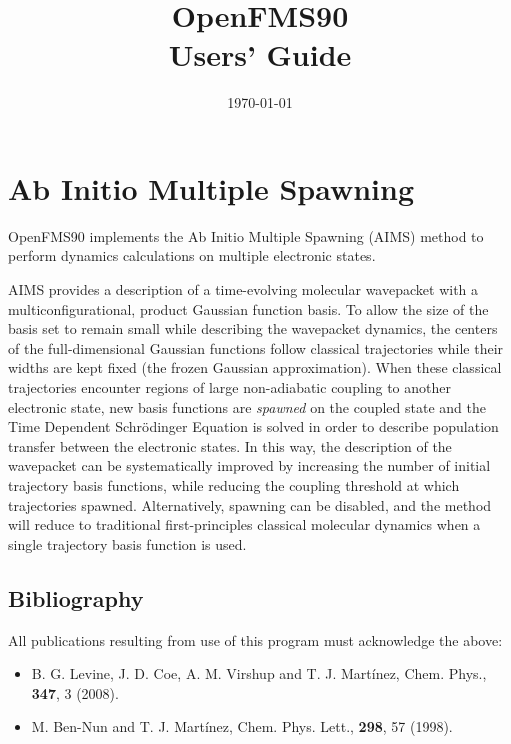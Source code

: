 \documentclass[11pt]{article}
\title{OpenFMS90 \\ Users' Guide}
\date{\today}
\begin{document}
\maketitle


\newpage
\tableofcontents
\newpage

\section{Ab Initio Multiple Spawning}


OpenFMS90 implements the Ab Initio Multiple Spawning (AIMS) method to perform dynamics 
calculations on multiple electronic states. 

AIMS provides a description of a time-evolving molecular wavepacket with a multiconfigurational, 
product Gaussian function basis. To allow the size of the basis set to remain small while describing 
the wavepacket dynamics, the centers of the full-dimensional Gaussian functions follow classical 
trajectories while their widths are kept fixed (the frozen Gaussian approximation). When these 
classical trajectories encounter regions of large non-adiabatic coupling to another electronic state, 
new basis functions are {\em spawned} on the coupled state and the Time Dependent Schr\"odinger 
Equation is solved in order to describe population transfer between the electronic states. In this way, 
the description of the wavepacket can be systematically improved by increasing the number of initial 
trajectory basis functions, while reducing the coupling threshold at which trajectories spawned. 
Alternatively, spawning can be disabled, and the method will reduce to traditional first-principles 
classical molecular dynamics when a single trajectory basis function is used.

\subsection{Bibliography}
\label{sec:aimsbiblio}
All publications resulting from use of this program must acknowledge
the above:
\begin{itemize}
\item B. G. Levine, J. D. Coe, A. M. Virshup and T. J. Mart\'{i}nez, Chem. Phys., \textbf{347}, 3 (2008).
\item M. Ben-Nun and T. J. Mart\'{i}nez, Chem. Phys. Lett., \textbf{298}, 57 (1998).
\end{itemize}
\end{document}
